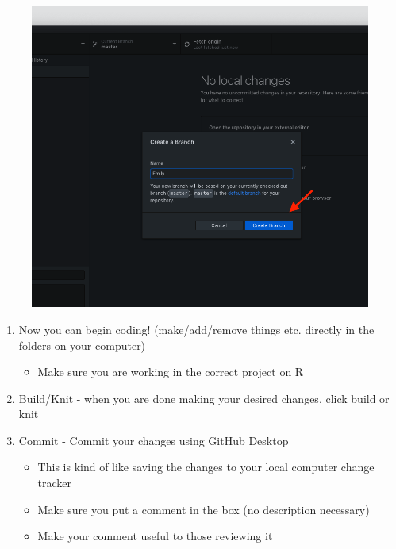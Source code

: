 \documentclass[]{book}
\providecommand{\tightlist}{%
  \setlength{\itemsep}{0pt}\setlength{\parskip}{0pt}}
\begin{document}
\begin{figure}
\centering
\includegraphics{images/research_protocols/github/29.png}
\caption{}
\end{figure}

\begin{enumerate}
\def\labelenumi{\arabic{enumi}.}
\setcounter{enumi}{2}
\item
  Now you can begin coding! (make/add/remove things etc. directly in the folders on your computer)

  \begin{itemize}
  \tightlist
  \item
    Make sure you are working in the correct project on R
  \end{itemize}
\item
  Build/Knit - when you are done making your desired changes, click build or knit
\item
  Commit - Commit your changes using GitHub Desktop

  \begin{itemize}
  \tightlist
  \item
    This is kind of like saving the changes to your local computer change tracker
  \item
    Make sure you put a comment in the box (no description necessary)
  \item
    Make your comment useful to those reviewing it
  \end{itemize}
\end{enumerate}
\end{document}

